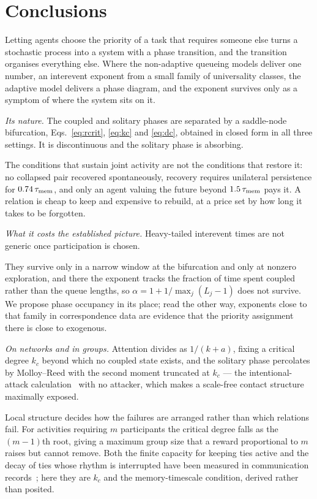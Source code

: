 \documentclass[aps,pre,twocolumn,superscriptaddress,floatfix,longbibliography]{revtex4-2}
\begin{document}
\section{Conclusions}
\label{sec:conclusions}

Letting agents choose the priority of a task that requires someone else turns a
stochastic process into a system with a phase transition, and the transition
organises everything else. Where the non-adaptive queueing models deliver
one number, an interevent exponent from a small family of universality classes,
the adaptive model delivers a phase diagram, and the exponent survives only as a
symptom of where the system sits on it.

\emph{Its nature.} The coupled and solitary phases are separated by a
saddle-node bifurcation, Eqs.~\eqref{eq:rcrit}, \eqref{eq:kc} and
\eqref{eq:dc}, obtained in closed form in all three settings. It is
discontinuous and the solitary phase is absorbing.

The conditions that sustain joint activity are not the conditions that
restore it: no collapsed pair recovered spontaneously, recovery requires
unilateral persistence for $0.74\,\tau_{\rm mem}$, and only an agent valuing the
future beyond $1.5\,\tau_{\rm mem}$ pays it.
A relation is cheap to keep and expensive to
rebuild, at a price set by how long it takes to be
forgotten.

\emph{What it costs the established picture.} Heavy-tailed interevent times are
not generic once participation is chosen.

They survive only in a narrow window at the bifurcation and only at nonzero
exploration, and there the exponent tracks the fraction of time spent coupled
rather than the queue lengths, so
$\alpha=1+1/\max_j(L_j-1)$ does not survive. We propose phase occupancy in its place; read
the other way, exponents
close to that family in correspondence data are evidence that the priority
assignment there is close to exogenous.

\emph{On networks and in groups.} Attention divides as $1/(k+a)$, fixing a
critical degree $k_c$ beyond which no coupled state exists, and the solitary
phase percolates by Molloy--Reed with the second moment truncated at $k_c$ ---
the intentional-attack calculation~\cite{cohen2001} with no attacker, which
makes a scale-free contact structure maximally exposed.

Local structure decides how the
failures are arranged rather than which relations fail. For activities requiring
$m$ participants the critical degree falls as the $(m-1)$th root, giving a
maximum group size that a reward proportional to $m$ raises but cannot remove.
Both the finite capacity for keeping ties active and the decay of ties
whose rhythm is interrupted have been measured in communication
records~\cite{miritello2013,dunbar1992,saramaki2014,navarro2017}; here they are
$k_c$ and the memory-timescale condition, derived rather than posited.
\end{document}
